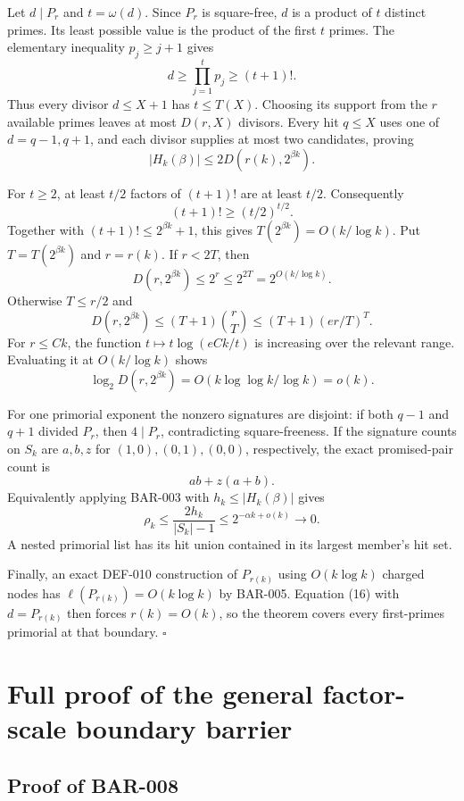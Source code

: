 \documentclass[11pt]{article}
\begin{document}
Let \(d\mid P_r\) and \(t=\omega(d)\). Since \(P_r\) is square-free, \(d\)
is a product of \(t\) distinct primes. Its least possible value is the product
of the first \(t\) primes. The elementary inequality \(p_j\ge j+1\) gives
\[
d\ge\prod_{j=1}^t p_j\ge(t+1)!.
\tag{16}
\]
Thus every divisor \(d\le X+1\) has \(t\le T(X)\). Choosing its support from
the \(r\) available primes leaves at most \(D(r,X)\) divisors. Every hit
\(q\le X\) uses one of \(d=q-1,q+1\), and each divisor supplies at most two
candidates, proving
\[
|H_k(\beta)|\le2D(r(k),2^{\beta k}).
\tag{17}
\]

For \(t\ge2\), at least \(t/2\) factors of \((t+1)!\) are at least \(t/2\).
Consequently
\[
(t+1)!\ge(t/2)^{t/2}.
\]
Together with \((t+1)!\le2^{\beta k}+1\), this gives
\(T(2^{\beta k})=O(k/\log k)\). Put \(T=T(2^{\beta k})\) and
\(r=r(k)\). If \(r<2T\), then
\[
D(r,2^{\beta k})\le2^r\le2^{2T}=2^{O(k/\log k)}.
\]
Otherwise \(T\le r/2\) and
\[
D(r,2^{\beta k})
\le(T+1)\binom rT
\le(T+1)(er/T)^T.
\tag{18}
\]
For \(r\le Ck\), the function \(t\mapsto t\log(eCk/t)\) is increasing over
the relevant range. Evaluating it at \(O(k/\log k)\) shows
\[
\log_2D(r,2^{\beta k})
=O(k\log\log k/\log k)=o(k).
\tag{19}
\]

For one primorial exponent the nonzero signatures are disjoint: if both
\(q-1\) and \(q+1\) divided \(P_r\), then \(4\mid P_r\), contradicting
square-freeness. If the signature counts on \(S_k\) are \(a,b,z\) for
\((1,0),(0,1),(0,0)\), respectively, the exact promised-pair count is
\[
ab+z(a+b).
\]
Equivalently applying BAR-003 with \(h_k\le|H_k(\beta)|\) gives
\[
\rho_k\le\frac{2h_k}{|S_k|-1}
\le2^{-\alpha k+o(k)}\longrightarrow0.
\tag{20}
\]
A nested primorial list has its hit union contained in its largest member's
hit set.

Finally, an exact DEF-010 construction of \(P_{r(k)}\) using
\(O(k\log k)\) charged nodes has \(\ell(P_{r(k)})=O(k\log k)\) by BAR-005.
Equation (16) with \(d=P_{r(k)}\) then forces \(r(k)=O(k)\), so the theorem
covers every first-primes primorial at that boundary. \(\square\)

\section{Full proof of the general factor-scale boundary barrier}

\subsection{Proof of BAR-008}\label{proof:BAR-008}
\end{document}
